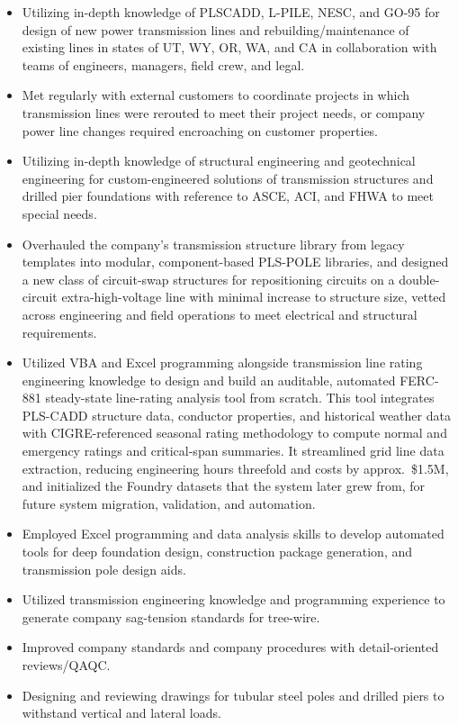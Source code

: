 \documentclass[10pt, letterpaper]{article}
\newenvironment{rlist}{%
  \begin{itemize}[leftmargin=1.4em, itemsep=1pt, topsep=2pt, parsep=0pt]%
}{%
  \end{itemize}%
}
\begin{document}
\begin{rlist}
  \item Utilizing in-depth knowledge of PLSCADD, L-PILE, NESC, and GO-95 for design of new power transmission lines and rebuilding/maintenance of existing lines in states of UT, WY, OR, WA, and CA in collaboration with teams of engineers, managers, field crew, and legal.
  \item Met regularly with external customers to coordinate projects in which transmission lines were rerouted to meet their project needs, or company power line changes required encroaching on customer properties.
  \item Utilizing in-depth knowledge of structural engineering and geotechnical engineering for custom-engineered solutions of transmission structures and drilled pier foundations with reference to ASCE, ACI, and FHWA to meet special needs.
  \item Overhauled the company's transmission structure library from legacy templates into modular, component-based PLS-POLE libraries, and designed a new class of circuit-swap structures for repositioning circuits on a double-circuit extra-high-voltage line with minimal increase to structure size, vetted across engineering and field operations to meet electrical and structural requirements.
  \item Utilized VBA and Excel programming alongside transmission line rating engineering knowledge to design and build an auditable, automated FERC-881 steady-state line-rating analysis tool from scratch. This tool integrates PLS-CADD structure data, conductor properties, and historical weather data with CIGRE-referenced seasonal rating methodology to compute normal and emergency ratings and critical-span summaries. It streamlined grid line data extraction, reducing engineering hours threefold and costs by approx.\ \$1.5M, and initialized the Foundry datasets that the system later grew from, for future system migration, validation, and automation.
  \item Employed Excel programming and data analysis skills to develop automated tools for deep foundation design, construction package generation, and transmission pole design aids.
  \item Utilized transmission engineering knowledge and programming experience to generate company sag-tension standards for tree-wire.
  \item Improved company standards and company procedures with detail-oriented reviews/QAQC.
  \item Designing and reviewing drawings for tubular steel poles and drilled piers to withstand vertical and lateral loads.
\end{rlist}
\end{document}
